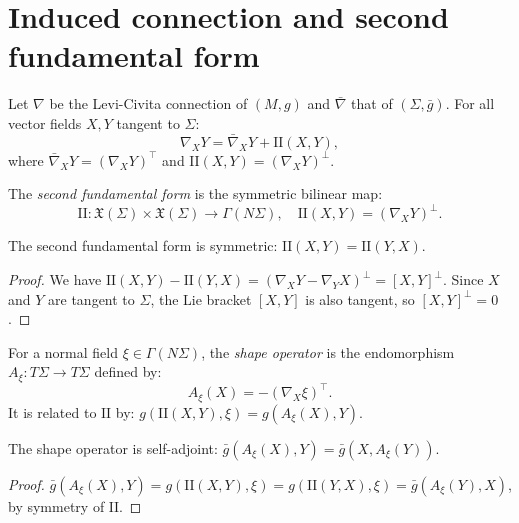 \section{Induced connection and second fundamental form}

\begin{definition}
Let $\nabla$ be the Levi-Civita connection of $(M, g)$ and $\bar{\nabla}$ that of
$(\Sigma, \bar{g})$. For all vector fields $X, Y$ tangent to $\Sigma$:
\[
    \nabla_X Y = \bar{\nabla}_X Y + \mathrm{I\!I}(X, Y),
\]
where $\bar{\nabla}_X Y = (\nabla_X Y)^\top$ and $\mathrm{I\!I}(X, Y) = (\nabla_X Y)^\perp$.
\end{definition}

\begin{definition}
The \emph{second fundamental form} is the symmetric bilinear map:
\[
    \mathrm{I\!I} : \mathfrak{X}(\Sigma) \times \mathfrak{X}(\Sigma) \to \Gamma(N\Sigma),
    \quad \mathrm{I\!I}(X, Y) = (\nabla_X Y)^\perp.
\]
\end{definition}

\begin{proposition}
The second fundamental form is symmetric: $\mathrm{I\!I}(X, Y) = \mathrm{I\!I}(Y, X)$.
\end{proposition}

\begin{proof}
We have $\mathrm{I\!I}(X, Y) - \mathrm{I\!I}(Y, X) = (\nabla_X Y - \nabla_Y X)^\perp
= [X, Y]^\perp$. Since $X$ and $Y$ are tangent to $\Sigma$, the Lie bracket
$[X, Y]$ is also tangent, so $[X, Y]^\perp = 0$.
\end{proof}

\begin{definition}
For a normal field $\xi \in \Gamma(N\Sigma)$, the \emph{shape operator} is the
endomorphism $A_\xi : T\Sigma \to T\Sigma$ defined by:
\[
    A_\xi(X) = -(\nabla_X \xi)^\top.
\]
It is related to $\mathrm{I\!I}$ by:
$g(\mathrm{I\!I}(X, Y), \xi) = g(A_\xi(X), Y)$.
\end{definition}

\begin{proposition}
The shape operator is self-adjoint:
$\bar{g}(A_\xi(X), Y) = \bar{g}(X, A_\xi(Y))$.
\end{proposition}

\begin{proof}
$\bar{g}(A_\xi(X), Y) = g(\mathrm{I\!I}(X, Y), \xi) = g(\mathrm{I\!I}(Y, X), \xi)
= \bar{g}(A_\xi(Y), X)$, by symmetry of $\mathrm{I\!I}$.
\end{proof}

